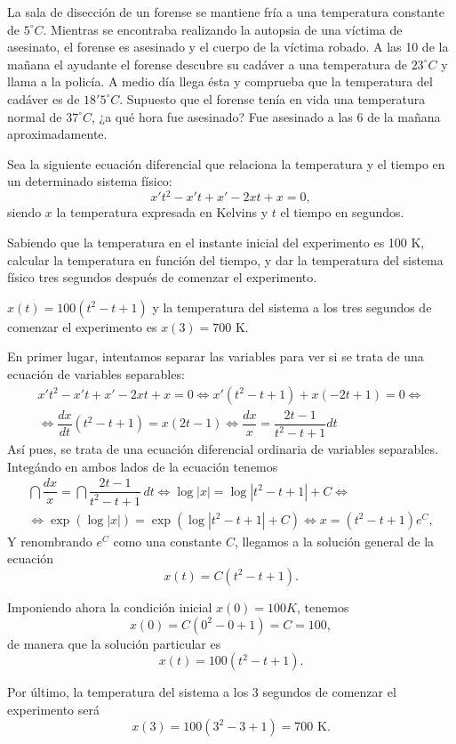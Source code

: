{La sala de disección de un forense se mantiene fría a una temperatura constante de $5^\circ C$. Mientras se encontraba
realizando la autopsia de una víctima de asesinato, el forense es asesinado y el cuerpo de la víctima robado. A las 10
de la mañana el ayudante el forense descubre su cadáver a una temperatura de $23^\circ C$ y llama a la policía. A medio
día llega ésta y comprueba que la temperatura del cadáver es de $18'5^\circ C$. Supuesto que el forense tenía en vida
una temperatura normal de $37^\circ C$, ¿a qué hora fue asesinado?}
{Fue asesinado a las 6 de la mañana aproximadamente.
}
{}



{Sea la siguiente ecuación diferencial que relaciona la temperatura y el tiempo en un determinado sistema físico:
\[
x't^2-x't+x'-2xt+x=0,
\]
siendo $x$ la temperatura expresada en Kelvins y $t$ el tiempo en segundos. 

Sabiendo que la temperatura en el instante inicial del experimento es 100 K, calcular la temperatura en función del tiempo, y dar la temperatura del sistema físico tres segundos después de comenzar el experimento.}
{$x(t)=100(t^2-t+1)$ y la temperatura del sistema a los tres segundos de comenzar el experimento es $x(3)=700$ K.
}
{En primer lugar, intentamos separar las variables para ver si se trata de una ecuación de variables separables:
\[\renewcommand{\arraystretch}{2}
\begin{array}{c}
x't^2  - x't + x' - 2xt + x = 0 \Leftrightarrow x'(t^2-t+1)+x(-2t+1)=0 \Leftrightarrow\\
\Leftrightarrow \dfrac{dx}{dt}(t^2-t+1)=x(2t-1) \Leftrightarrow \dfrac{dx}{x}=\dfrac{2t-1}{t^2-t+1} dt
\end{array}
\]
Así pues, se trata de una ecuación diferencial ordinaria de variables separables. Integándo en ambos lados de la
ecuación tenemos  
\[\renewcommand{\arraystretch}{2}
\begin{array}{c}
\dint \dfrac{dx}{x}=\dint \dfrac{2t-1}{t^2-t+1}\,dt \Leftrightarrow \log |x|= \log |t^2-t+1|+C \Leftrightarrow \\
\Leftrightarrow \exp(\log |x| )= \exp(\log |t^2-t+1|+C) \Leftrightarrow x=(t^2-t+1)e^C,
\end{array}
\]
Y renombrando $e^C$ como una constante $C$, llegamos a la solución general de la ecuación
\[
x(t)=C(t^2-t+1).
\]

Imponiendo ahora la condición inicial $x(0)=100 K$, tenemos
\[
x(0)=C(0^2-0+1)=C=100,
\]
de manera que la solución particular es
\[
x(t)=100(t^2-t+1).
\]

Por último, la temperatura del sistema a los 3 segundos de comenzar el experimento será
\[
x(3)=100(3^2-3+1)=700\textrm{ K}.
\]
}


